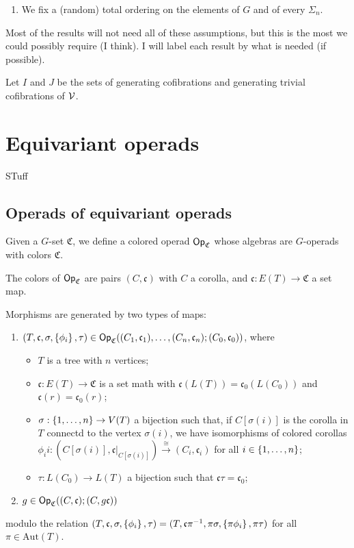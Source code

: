 \documentclass[psamsfonts,oneside,10pt,letterpaper
,draft
]{amsart}%
\renewcommand{\C}{\ensuremath{\mathfrak{C}}}
\renewcommand{\fc}{\ensuremath{\mathfrak{c}}}
\renewcommand{\1}{\ensuremath{\mathbb{id}}}
\begin{document}
\begin{enumerate}
\item We fix a (random) total ordering on the elements of $G$ and of every $\Sigma_n$.
\end{enumerate}

Most of the results will not need all of these assumptions, but this is the most we could possibly require (I think). I will label each result by what is needed (if possible).

Let $I$ and $J$ be the sets of generating cofibrations and generating trivial cofibrations of $\mathcal V$.


\newpage
\section{Equivariant operads}

STuff

\subsection{Operads of equivariant operads}

Given a $G$-set $\C$, we define a colored operad $\Op_\C$ whose algebras are $G$-operads with colors $\C$.

The colors of $\Op_\C$ are pairs $(C,\fc)$ with $C$ a corolla, and $\fc: E(T) \to \C$ a set map.

Morphisms are generated by two types of maps:
\begin{enumerate}
\item $(T,\fc,\sigma,\set{\phi_i},\tau)\in \Op_\C((C_1,\fc_1), \ldots, (C_n,\fc_n); (C_0,\fc_0))$, where
      \begin{itemize}
      \item $T$ is a tree with $n$ vertices;
      \item $\fc: E(T)\to \C$ is a set math with $\fc(L(T)) = \fc_0(L(C_0))$ and $\fc(r) = \fc_0(r)$;
      \item $\sigma: \left\{1,\ldots, n\right\}\to V(T)$ a bijection such that, if $C[\sigma(i)]$ is the corolla in $T$ connectd to the vertex $\sigma(i)$, we have isomorphisms of colored corollas $\phi_ii: (C[\sigma(i)], \fc|_{C[\sigma(i)]})\xrightarrow{\cong} (C_i, \fc_i)$ for all $i\in \left\{1,\ldots, n\right\}$;
      \item $\tau: L(C_0)\to L(T)$ a bijection such that $\fc\tau = \fc_0$;
      \end{itemize}
\item $g\in \Op_\C((C,\fc); (C,g\fc))$
\end{enumerate}
modulo the relation $(T,\fc,\sigma,\set{\phi_i},\tau) = (T,\fc\pi^{-1},\pi\sigma,\set{\pi\phi_i},\pi\tau)$ for all $\pi\in \mathrm{Aut}(T)$.
\end{document}
